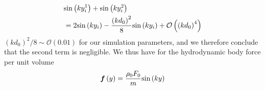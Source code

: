 \documentclass[%
 reprint,
superscriptaddress,
longbibliography,
 amsmath,amssymb,
 prl,
 citeautoscript,
]{revtex4-1}
\begin{document}
\begin{equation}
\begin{split}
&{\rm sin} \left( k y_i^1 \right) + {\rm sin} \left( k y_i^2 \right) \\
&= 2 {\rm sin} \left( k y_i \right) - \frac{\left( k d_0 \right)^2}{8} {\rm sin} \left( k y_i \right) + \mathcal{O} \left( \left( kd_0 \right)^4 \right)
\end{split}
\label{eqn:sine_expansion2}
\end{equation}
$\left( k d_0 \right)^2/8 \sim \mathcal{O} \left( 0.01 \right)$ for our simulation parameters, and we therefore conclude that the second term is negligible. We thus have for the hydrodynamic body force per unit volume
\begin{equation}
{\boldsymbol f} \left( y \right) = \frac{\rho_0 F_0}{m} {\rm sin} \left( k y \right)
\label{eqn:hydrodynamic_force}
\end{equation}
\end{document}
